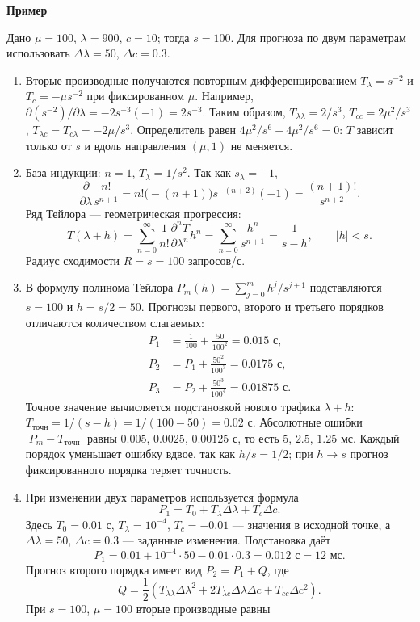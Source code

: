 \documentclass[12pt,a4paper]{article}
\newcommand{\taskhead}[1]{\par\textbf{#1}\par}
\begin{document}
\taskhead{Пример}
Дано $\mu=100$, $\lambda=900$, $c=10$; тогда $s=100$. Для прогноза по двум параметрам использовать $\Delta\lambda=50$, $\Delta c=0.3$.
\begin{enumerate}
\item Вторые производные получаются повторным дифференцированием
$T_\lambda=s^{-2}$ и $T_c=-\mu s^{-2}$ при фиксированном $\mu$.
Например, $\partial(s^{-2})/\partial\lambda=-2s^{-3}(-1)=2s^{-3}$.
Таким образом, $T_{\lambda\lambda}=2/s^3$, $T_{cc}=2\mu^2/s^3$,
$T_{\lambda c}=T_{c\lambda}=-2\mu/s^3$.
Определитель равен $4\mu^2/s^6-4\mu^2/s^6=0$:
$T$ зависит только от $s$ и вдоль направления $(\mu,1)$ не меняется.
\item База индукции: $n=1$, $T_\lambda=1/s^2$. Так как $s_\lambda=-1$,
\[
\frac{\partial}{\partial\lambda}\frac{n!}{s^{n+1}}
=n!\bigl(-(n+1)\bigr)s^{-(n+2)}(-1)=\frac{(n+1)!}{s^{n+2}}.
\]
Ряд Тейлора --- геометрическая прогрессия:
\[
T(\lambda+h)=\sum_{n=0}^\infty\frac1{n!}\frac{\partial^nT}{\partial\lambda^n}h^n
=\sum_{n=0}^\infty\frac{h^n}{s^{n+1}}=\frac1{s-h},\qquad |h|<s.
\]
Радиус сходимости $R=s=100$ запросов/с.
\item В формулу полинома Тейлора
$P_m(h)=\sum_{j=0}^{m}h^j/s^{j+1}$ подставляются $s=100$ и $h=s/2=50$.
Прогнозы первого, второго и третьего порядков отличаются количеством слагаемых:
\[
\begin{aligned}
P_1&=\frac1{100}+\frac{50}{100^2}=0.015\text{ с},\\
P_2&=P_1+\frac{50^2}{100^3}=0.0175\text{ с},\\
P_3&=P_2+\frac{50^3}{100^4}=0.01875\text{ с}.
\end{aligned}
\]
Точное значение вычисляется подстановкой нового трафика $\lambda+h$:
$T_{\mathrm{точн}}=1/(s-h)=1/(100-50)=0.02$ с.
Абсолютные ошибки $|P_m-T_{\mathrm{точн}}|$ равны
$0.005$, $0.0025$, $0.00125$ с, то есть $5$, $2.5$, $1.25$ мс.
Каждый порядок уменьшает ошибку вдвое, так как $h/s=1/2$;
при $h\to s$ прогноз фиксированного порядка теряет точность.
\item При изменении двух параметров используется формула
\[
P_1=T_0+T_\lambda\Delta\lambda+T_c\Delta c.
\]
Здесь $T_0=0.01$ с, $T_\lambda=10^{-4}$, $T_c=-0.01$ --- значения
в исходной точке, а $\Delta\lambda=50$, $\Delta c=0.3$ --- заданные изменения.
Подстановка даёт
\[
P_1=0.01+10^{-4}\cdot50-0.01\cdot0.3=0.012\text{ с}=12\text{ мс}.
\]
Прогноз второго порядка имеет вид $P_2=P_1+Q$, где
\[
Q=\frac12\left(T_{\lambda\lambda}\Delta\lambda^2
+2T_{\lambda c}\Delta\lambda\Delta c+T_{cc}\Delta c^2\right).
\]
При $s=100$, $\mu=100$ вторые производные равны

\end{enumerate}
\end{document}

